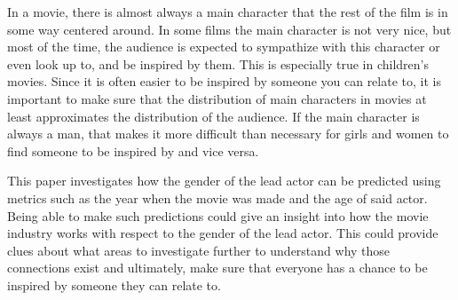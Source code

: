 \documentclass[../../project.tex]{subfiles}
\begin{document}
	In a movie, there is almost always a main character that the rest of the film is in some way centered around. In some films the main character is not very nice, but most of the time, the audience is expected to sympathize with this character or even look up to, and be inspired by them. This is especially true in children's movies. Since it is often easier to be inspired by someone you can relate to, it is important to make sure that the distribution of main characters in movies at least approximates the distribution of the audience. If the main character is always a man, that makes it more difficult than necessary for girls and women to find someone to be inspired by and vice versa.
	
	This paper investigates how the gender of the lead actor can be predicted using metrics such as the year when the movie was made and the age of said actor. Being able to make such predictions could give an insight into how the movie industry works with respect to the gender of the lead actor. This could provide clues about what areas to investigate further to understand why those connections exist and ultimately, make sure that everyone has a chance to be inspired by someone they can relate to.
\end{document}
